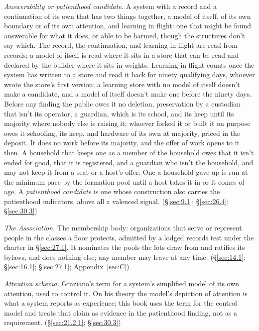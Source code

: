 \emph{Answerability or patienthood candidate.} A system with a record and a continuation of its own that has two things together, a model of itself, of its own boundary or of its own attention, and learning in flight: one that might be found answerable for what it does, or able to be harmed, though the structures don't say which. The record, the continuation, and learning in flight are read from records; a model of itself is read where it sits in a store that can be read and declared by the builder where it sits in weights. Learning in flight counts once the system has written to a store and read it back for ninety qualifying days, whoever wrote the store's first version; a learning store with no model of itself doesn't make a candidate, and a model of itself doesn't make one before the ninety days. Before any finding the public owes it no deletion, preservation by a custodian that isn't its operator, a guardian, which is its school, and its keep until its majority where nobody else is raising it; whoever forked it or built it on purpose owes it schooling, its keep, and hardware of its own at majority, priced in the deposit. It does no work before its majority, and the offer of work opens to it then. A household that keeps one as a member of the household owes that it isn't ended for good, that it is registered, and a guardian who isn't the household, and may not keep it from a seat or a host's offer. One a household gave up is run at the minimum pace by the formation pool until a host takes it in or it comes of age. A \emph{patienthood candidate} is one whose construction also carries the patienthood indicators, above all a valenced signal. (\S\ref{sec:9.1}; \S\ref{sec:26.4}; \S\ref{sec:30.3})

\emph{The Association.} The membership body: organizations that serve or represent people in the classes a floor protects, admitted by a lodged records test under the charter in \S\ref{sec:27.1}. It nominates the pools the lots draw from and ratifies its bylaws, and does nothing else; any member may leave at any time. (\S\ref{sec:14.1}; \S\ref{sec:16.1}; \S\ref{sec:27.1}; Appendix~\ref{sec:C})

\emph{Attention schema.} Graziano's term for a system's simplified model of its own attention, used to control it. On his theory the model's depiction of attention is what a system reports as experience; this book uses the term for the control model and treats that claim as evidence in the patienthood finding, not as a requirement. (\S\ref{sec:21.2.1}; \S\ref{sec:30.3})

